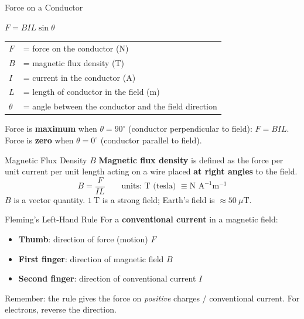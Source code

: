 \begin{formulabox}{Force on a Conductor}
\begin{center}
\Large $F = BIL\sin\theta$
\end{center}
\vspace{0.3em}
\begin{tabular}{@{}ll@{}}
$F$ & = force on the conductor (N) \\
$B$ & = magnetic flux density (T) \\
$I$ & = current in the conductor (A) \\
$L$ & = length of conductor in the field (m) \\
$\theta$ & = angle between the conductor and the field direction \\
\end{tabular}
\vspace{0.4em}

Force is \textbf{maximum} when $\theta = 90^\circ$ (conductor perpendicular to field): $F = BIL$.\\
Force is \textbf{zero} when $\theta = 0^\circ$ (conductor parallel to field).
\end{formulabox}

\begin{definitionbox}{Magnetic Flux Density $B$}
\textbf{Magnetic flux density} is defined as the force per unit current per unit length acting on a wire placed \textbf{at right angles} to the field.
$$B = \frac{F}{IL} \qquad \text{units: T (tesla) } \equiv \text{N A}^{-1}\text{m}^{-1}$$
$B$ is a vector quantity. $1\ \text{T}$ is a strong field; Earth's field is $\approx 50\ \mu\text{T}$.
\end{definitionbox}

\pagebreak

\begin{keybox}{Fleming's Left-Hand Rule}
For a \textbf{conventional current} in a magnetic field:
\begin{itemize}[itemsep=2pt]
  \item \textbf{Thumb}: direction of force (motion) $F$
  \item \textbf{First finger}: direction of magnetic field $B$
  \item \textbf{Second finger}: direction of conventional current $I$
  
\end{itemize}
Remember: the rule gives the force on \emph{positive} charges / conventional current. For electrons, reverse the direction.
\end{keybox}

